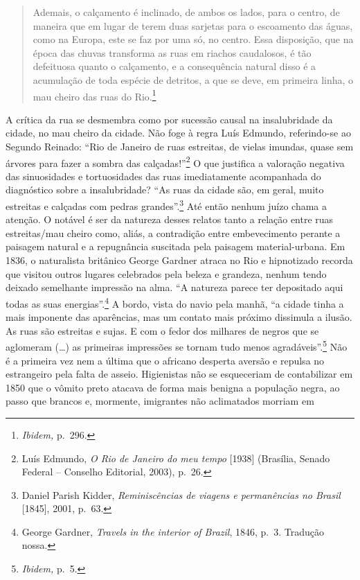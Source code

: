 \begin{quote}
Ademais, o calçamento é inclinado, de ambos os lados, para o centro, de
maneira que em lugar de terem duas sarjetas para o escoamento das águas,
como na Europa, este se faz por uma só, no centro. Essa disposição, que
na época das chuvas transforma as ruas em riachos caudalosos, é tão
defeituosa quanto o calçamento, e a consequência natural disso é a
acumulação de toda espécie de detritos, a que se deve, em primeira
linha, o mau cheiro das ruas do Rio.\footnote{\emph{Ibidem,} p.~296.}
\end{quote}

A crítica da rua se desmembra como por sucessão causal na insalubridade
da cidade, no mau cheiro da cidade. Não foge à regra Luís Edmundo,
referindo-se ao Segundo Reinado: ``Rio de Janeiro de ruas estreitas, de
vielas imundas, quase sem árvores para fazer a sombra das
calçadas!''\footnote{Luís Edmundo, \emph{O Rio de Janeiro do meu tempo}
  {[}1938{]} (Brasília, Senado Federal -- Conselho Editorial, 2003),
  p.~26.} O que justifica a valoração negativa das sinuosidades e
tortuosidades das ruas imediatamente acompanhada do diagnóstico sobre a
insalubridade? ``As ruas da cidade são, em geral, muito estreitas e
calçadas com pedras grandes''.\footnote{Daniel Parish Kidder,
  \emph{Reminiscências de viagens e permanências no Brasil} {[}1845{]},
  2001, p.~63.} Até então nenhum juízo chama a atenção. O notável é ser
da natureza desses relatos tanto a relação entre ruas estreitas/mau
cheiro como, aliás, a contradição entre embevecimento perante a paisagem
natural e a repugnância suscitada pela paisagem material-urbana. Em
1836, o naturalista britânico George Gardner atraca no Rio e hipnotizado
recorda que visitou outros lugares celebrados pela beleza e grandeza,
nenhum tendo deixado semelhante impressão na alma. ``A natureza parece
ter depositado aqui todas as suas energias''.\footnote{George Gardner,
  \emph{Travels in the interior of Brazil}, 1846, p.~3. Tradução nossa.}
A bordo, vista do navio pela manhã, ``a cidade tinha a mais imponente
das aparências, mas um contato mais próximo dissimula a ilusão. As ruas
são estreitas e sujas. E com o fedor dos milhares de negros que se
aglomeram (\ldots{}) as primeiras impressões se tornam tudo menos
agradáveis''.\footnote{\emph{Ibidem,} p.~5.} Não é a primeira vez nem a
última que o africano desperta aversão e repulsa no estrangeiro pela
falta de asseio. Higienistas não se esqueceriam de contabilizar em 1850
que o vômito preto atacava de forma mais benigna a população negra, ao
passo que brancos e, mormente, imigrantes não aclimatados morriam em

